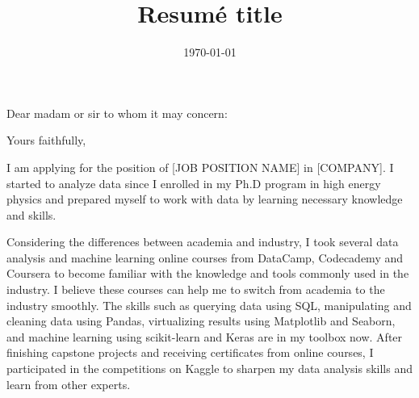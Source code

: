 \documentclass[11pt,letterpaper]{moderncv}   %
\title{Resumé title}                               %
\begin{document}
%
%

\date{\today}

\opening{Dear madam or sir to whom it may concern:}
\closing{Yours faithfully,} %

\makelettertitle

%
%
%
%

\justifying
I am applying for the position of [JOB POSITION NAME] in [COMPANY].
I started to analyze data since I enrolled in my Ph.D program in high energy physics and prepared myself to work with data by learning necessary knowledge and skills.

Considering the differences between academia and industry, I took several data analysis and machine learning online courses from DataCamp, Codecademy and Coursera to become familiar with the knowledge and tools commonly used in the industry.
I believe these courses can help me to switch from academia to the industry smoothly.
The skills such as querying data using SQL, manipulating and cleaning data using Pandas, virtualizing results using Matplotlib and Seaborn, and machine learning using scikit-learn and Keras are in my toolbox now.
After finishing capstone projects and receiving certificates from online courses, I participated in the competitions on Kaggle to sharpen my data analysis skills and learn from other experts.
\end{document}
